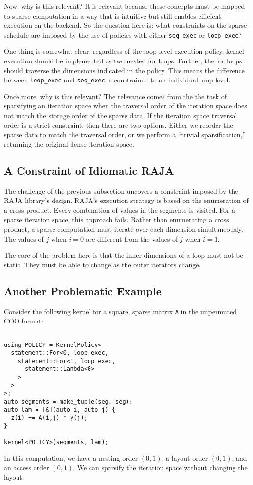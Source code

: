 Now, why is this relevant? 
It is relevant because these concepts must be mapped to sparse computation in a way that is intuitive but still enables efficient execution on the backend.
So the question here is: what constraints on the sparse schedule are imposed by the use of policies with either \verb.seq_exec. or \verb.loop_exec.?

One thing is somewhat clear: regardless of the loop-level execution policy, kernel execution should be implemented as two nested for loops. 
Further, the for loops should traverse the dimensions indicated in the policy. 
This means the difference between \verb.loop_exec. and \verb.seq_exec. is constrained to an individual loop level. 

Once more, why is this relevant? 
The relevance comes from the the task of sparsifying an iteration space when the traversal order of the iteration space does not match the storage order of the sparse data.
If the iteration space traversal order is a strict constraint, then there are two options.
Either we reorder the sparse data to match the traversal order, or we perform a \enquote{trivial sparsification,} returning the original dense iteration space.

\subsection{A Constraint of Idiomatic RAJA}

The challenge of the previous subsection uncovers a constraint imposed by the RAJA library's design.
RAJA's execution strategy is based on the enumeration of a cross product. 
Every combination of values in the segments is visited.
For a sparse iteration space, this approach fails.
Rather than enumerating a cross product, a sparse computation must iterate over each dimension simultaneously. 
The values of $j$ when $i=0$ are different from the values of $j$ when $i=1$. 

The core of the problem here is that the inner dimensions of a loop must not be static. 
They must be able to change as the outer iterators change.

\subsection{Another Problematic Example}

Consider the following kernel for a square, sparse matrix \verb.A. in the unpermuted COO format:
\begin{lstlisting}

using POLICY = KernelPolicy<
  statement::For<0, loop_exec,
    statement::For<1, loop_exec,
      statement::Lambda<0>
    >
  >
>;
auto segments = make_tuple(seg, seg);
auto lam = [&](auto i, auto j) {
  z(i) += A(i,j) * y(j);
}

kernel<POLICY>(segments, lam);
\end{lstlisting}
In this computation, we have a nesting order $(0,1)$, a layout order $(0,1)$, and an access order $(0,1)$. 
We can sparsify the iteration space without changing the layout.

